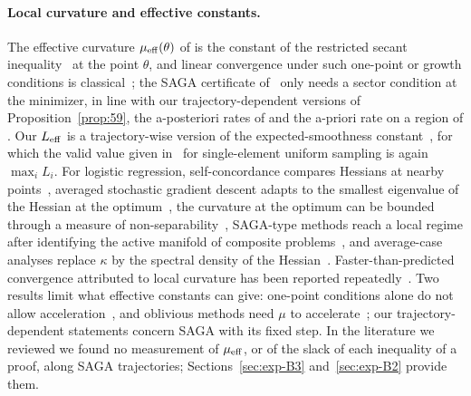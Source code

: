 \paragraph{Local curvature and effective constants.}
The effective curvature $\mu_{\mathrm{eff}}(\theta)$ of  is the constant of the restricted secant
inequality~\cite{zhang2013gradient} at the point $\theta$, and linear convergence under such one-point or growth
conditions is classical~\cite{karimi2016linear,necoara2019linear}; the SAGA certificate of~\cite{hu2017unified} only
needs a sector condition at the minimizer, in line with our trajectory-dependent versions of
Proposition~\ref{prop:59}, the a-posteriori rates of  and the a-priori rate on a region of
. Our $L_{\mathrm{eff}}$ is a
trajectory-wise version of the expected-smoothness constant~\cite{gower2019sgd,gower2021stochastic}, for which the
valid value given in~\cite{gower2021stochastic} for single-element uniform sampling is again $\max_iL_i$. For logistic
regression,
self-concordance compares Hessians at nearby points~\cite{bach2010self,sun2019generalized}, averaged stochastic
gradient descent adapts to the smallest eigenvalue of the Hessian at the optimum~\cite{bach2014adaptivity}, the
curvature at the optimum can be bounded through a measure of non-separability~\cite{freund2018condition}, SAGA-type
methods reach a local regime after identifying the active manifold of composite problems~\cite{poon2018local}, and
average-case analyses replace $\kappa$ by the spectral density of the Hessian~\cite{pedregosa2020acceleration}.
Faster-than-predicted convergence attributed to local curvature has been reported
repeatedly~\cite{lin2015universal,kulunchakov2019estimate,zhou2019direct}. Two results limit what effective constants
can give: one-point conditions alone do not allow acceleration~\cite{guilleescuret2022gradient}, and oblivious
methods need $\mu$ to accelerate~\cite{arjevani2017limitations}; our trajectory-dependent statements concern SAGA with
its fixed step. In the literature we reviewed we found no measurement of $\mu_{\mathrm{eff}}$, or of the slack of each inequality
of a proof, along SAGA trajectories; Sections~\ref{sec:exp-B3} and~\ref{sec:exp-B2} provide them.

